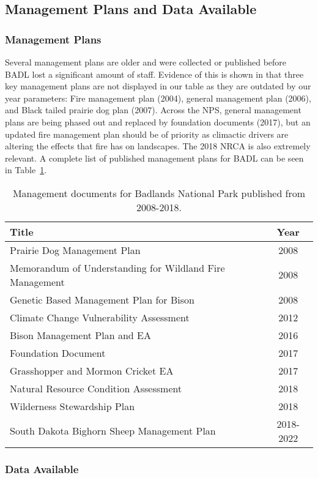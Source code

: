 \subsection{Management Plans and Data Available}

\subsubsection{Management Plans}

Several management plans are older and were collected or published before BADL lost a significant amount of staff.
Evidence of this is shown in that three key management plans are not displayed in our table as they are outdated by our year parameters: Fire management plan (2004), general management plan (2006), and Black tailed prairie dog plan (2007). 
Across the NPS, general management plans are being phased out and replaced by foundation documents (2017), but an updated fire management plan should be of priority as climactic drivers are altering the effects that fire has on landscapes. 
The 2018 NRCA is also extremely relevant.
A complete list of published management plans for BADL can be seen in Table~\ref{tab:BADLManDocs}.

\begin{table}[h]
	\centering
\caption[BADL management documents]
	{Management documents for Badlands National Park published from 2008-2018.} 
\label{tab:BADLManDocs}
\begin{tabular}{lc}
\toprule
Title & Year\tabularnewline
\midrule
Prairie Dog Management Plan & 2008 \tabularnewline
Memorandum of Understanding for Wildland Fire Management & 2008 \tabularnewline
Genetic Based Management Plan for Bison & 2008 \tabularnewline
Climate Change Vulnerability Assessment & 2012 \tabularnewline
Bison Management Plan and EA & 2016 \tabularnewline
Foundation Document & 2017 \tabularnewline
Grasshopper and Mormon Cricket EA  & 2017 \tabularnewline
Natural Resource Condition Assessment & 2018 \tabularnewline
Wilderness Stewardship Plan & 2018 \tabularnewline
South Dakota Bighorn Sheep Management Plan & 2018-2022 \tabularnewline
\bottomrule
\end{tabular}
\end{table}

\subsubsection{Data Available}

